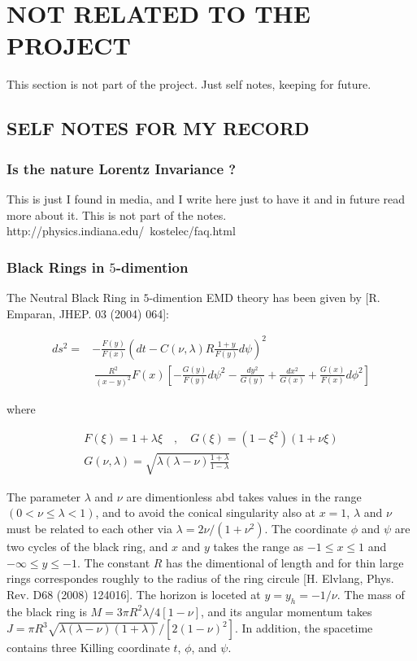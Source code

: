 \chapter{NOT RELATED TO THE PROJECT}

This section is not part of the project. Just self notes, keeping for future.  

\section{SELF NOTES FOR MY RECORD}

\subsection{Is the nature Lorentz Invariance ?}
This is just I found in media, and I write here just to have it and in future read more about it. This is not part of the notes.\\

http://physics.indiana.edu/~kostelec/faq.html

\subsection{Black Rings in $5$-dimention}

The Neutral Black Ring in $5$-dimention EMD theory has been given by [R. Emparan, JHEP. 03 (2004) 064]:

\begin{align}
   ds^2 =& -\frac{F(y)}{F(x)}\left(dt - C(\nu,\lambda)R\frac{1+y}{F(y)}d\psi\right)^2 \nonumber\\
         & ~ \frac{R^2}{(x-y)^2}F(x)\left[-\frac{G(y)}{F(y)}d\psi^2 - \frac{dy^2}{G(y)} + \frac{dx^2}{G(x)} + \frac{G(x)}{F(x)}d\phi^2\right]
\end{align}

where

\begin{align}
   F(\xi) = 1 + \lambda\xi \quad , \quad G(\xi) = (1-\xi^2)(1+\nu\xi) \nonumber\\
   G(\nu,\lambda) = \sqrt{\lambda(\lambda-\nu)\frac{1+\lambda}{1-\lambda}}
\end{align}

The parameter $\lambda$ and $\nu$ are dimentionless abd takes values in the range $(0<\nu\leq\lambda<1)$, and to avoid the conical singularity also at $x=1$, $\lambda$ and $\nu$ must be related to each other via $\lambda = 2\nu/(1+\nu^2)$. The coordinate $\phi$ and $\psi$ are two cycles of the black ring, and $x$ and $y$ takes the range as $-1\leq x \leq 1$ and $-\infty\leq y \leq -1$. The constant $R$ has the dimentional of length and for thin large rings correspondes roughly to the radius of the ring circule [H. Elvlang, Phys. Rev. D68 (2008) 124016]. The horizon is loceted at $y=y_h=-1/\nu$. The mass of the black ring is $M = 3\pi R^2\lambda/4[1-\nu]$, and its angular momentum takes $J = \pi R^3\sqrt{\lambda(\lambda-\nu)(1+\lambda)}/[2(1-\nu)^2]$. In addition, the spacetime contains three Killing coordinate $t$, $\phi$, and $\psi$.  
